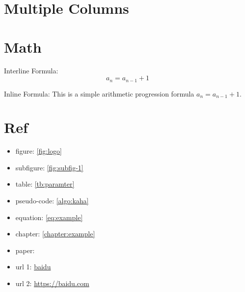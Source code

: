 \documentclass[
    UTF8
]{report}
\begin{document}
\section{Multiple Columns}
\begin{multicols}{2}
    \lipsum[1-3]
\end{multicols}

\section{Math}

Interline Formula:
\begin{equation}
    \label{eq:example}
    a_n = a_{n-1} + 1
\end{equation}

Inline Formula:
This is a simple arithmetic progression formula $a_n = a_{n-1} + 1$.

\section{Ref}
\begin{itemize}
    \item figure: \autoref{fig:logo}
    \item subfigure: \autoref{fig:subfig-1}
    \item table: \autoref{tb:paramter}
    \item pseudo-code: \autoref{algo:kaha}
    \item equation: \autoref{eq:example}
    \item chapter: \autoref{chapter:example}
    \item paper: \cite{he2016deep}
    \item url 1: \href{https://baidu.com}{baidu}
    \item url 2: \url{https://baidu.com}
\end{itemize}


\printbibliography[title={Reference}]
\end{document}
